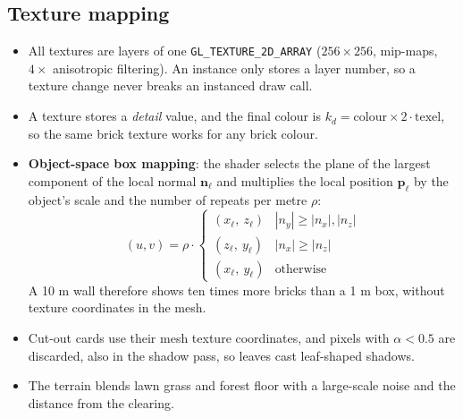 \subsection{Texture mapping}
\begin{itemize}
  \item All textures are layers of one \texttt{GL\_TEXTURE\_2D\_ARRAY} ($256\times256$, mip-maps, $4\times$
        anisotropic filtering). An instance only stores a layer number, so a texture change never breaks an
        instanced draw call.
  \item A texture stores a \emph{detail} value, and the final colour is $k_d = \text{colour}\times 2\cdot\text{texel}$,
        so the same brick texture works for any brick colour.
  \item \textbf{Object-space box mapping}: the shader selects the plane of the largest component of the local
        normal $\mathbf{n}_\ell$ and multiplies the local position $\mathbf{p}_\ell$ by the object's scale and the number of
        repeats per metre $\rho$:
        \[
        (u,v) = \rho\cdot\begin{cases}(x_\ell,\ z_\ell) & |n_y|\ge|n_x|,|n_z|\\ (z_\ell,\ y_\ell) & |n_x|\ge|n_z|\\ (x_\ell,\ y_\ell) & \text{otherwise}\end{cases}
        \]
        A 10 m wall therefore shows ten times more bricks than a 1 m box, without texture coordinates in the mesh.
  \item Cut-out cards use their mesh texture coordinates, and pixels with $\alpha<0.5$ are discarded, also in the
        shadow pass, so leaves cast leaf-shaped shadows.
  \item The terrain blends lawn grass and forest floor with a large-scale noise and the distance from the clearing.
\end{itemize}

